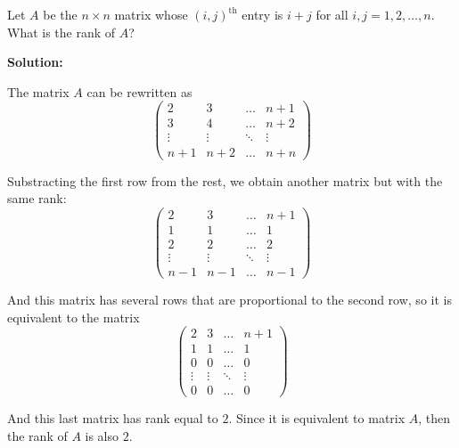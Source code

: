 \documentclass[../../main.tex]{subfiles}
\begin{document}
  \begin{shaded}
    Let $A$ be the $n \times n$ matrix whose $(i, j)^\text{th}$ entry is $i + j$ for all $i, j = 1, 2, \dots, n$. What is the rank of $A$?
  \end{shaded}

  \textbf{Solution:}

  The matrix $A$ can be rewritten as
  $$
  \begin{pmatrix}
    2 & 3 & \dots & n + 1 \\
    3 & 4 & \dots & n + 2 \\
    \vdots & \vdots & \ddots & \vdots \\
    n + 1 & n + 2 & \dots & n + n
  \end{pmatrix}
  $$

  Substracting the first row from the rest, we obtain another matrix but with the same rank:
  $$
  \begin{pmatrix}
    2 & 3 & \dots & n + 1 \\
    1 & 1 & \dots & 1 \\
    2 & 2 & \dots & 2 \\
    \vdots & \vdots & \ddots & \vdots \\
    n - 1 & n - 1 & \dots & n - 1
  \end{pmatrix}
  $$

  And this matrix has several rows that are proportional to the second row, so it is equivalent to the matrix
  $$
  \begin{pmatrix}
    2 & 3 & \dots & n + 1 \\
    1 & 1 & \dots & 1 \\
    0 & 0 & \dots & 0 \\
    \vdots & \vdots & \ddots & \vdots \\
    0 & 0 & \dots & 0
  \end{pmatrix}
  $$

  And this last matrix has rank equal to $2$. Since it is equivalent to matrix $A$, then the rank of $A$ is also $2$.
\end{document}
